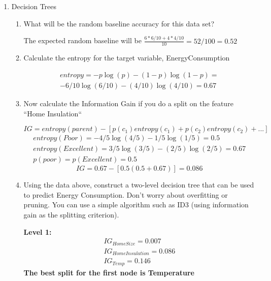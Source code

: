 \documentclass[a4paper, 11pt]{article}
\begin{document}
\begin{enumerate}
\item Decision Trees
	\begin{enumerate}
		\item What will be the random baseline accuracy for this data set?
		
		The expected random baseline will be $\frac{6 * 6/10 + 4 * 4 / 10}{10} = 52/100 = 0.52$
		\item Calculate the entropy for the target variable, EnergyConsumption
		
		\begin{gather*}
		entropy = -p \log(p) - (1-p)\log(1-p) = \\
		-6/10 \log(6/10) - (4/10)\log(4/10) = 0.67
		\end{gather*}
		
		\item Now calculate the Information Gain if you do a split on the feature “Home Insulation“
		
		$$IG = entropy(parent) - [p(c_{1}) entropy(c_{1}) + p(c_{2}) entropy(c_{2}) + ...]$$
		\begin{gather*}
		entropy(Poor) = -4/5\log(4/5) - 1/5\log(1/5) = 0.5\\
		entropy(Excellent) = 3/5 \log(3/5) - (2/5)\log(2/5) = 0.67\\
		p(poor) = p(Excellent) = 0.5
		\end{gather*}
		$$IG = 0.67 - [0.5(0.5 + 0.67)] = 0.086$$
		
		\item  Using the data above, construct a two-level decision tree that can be used to predict Energy Consumption. Don’t worry about overfitting or pruning. You can use a simple algorithm such as ID3 (using information gain as the splitting criterion).
		
		
		\textbf{Level 1:}
		\begin{gather*}
		IG_{HomeSize}= 0.007 \\
		IG_{HomeInsulation} = 0.086\\
		IG_{Temp} = 0.146
		\end{gather*}
		\textbf{The best split for the first node is Temperature}\\
		

\end{enumerate}
\end{enumerate}
\end{document}
